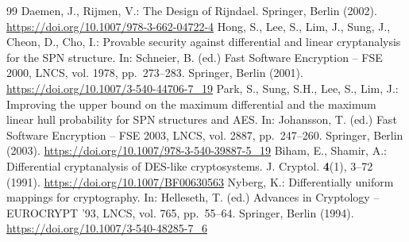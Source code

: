 \documentclass[11pt]{article}
\theoremstyle{definition}
\theoremstyle{remark}
\begin{document}
\begin{thebibliography}{99}
 Daemen, J., Rijmen, V.: The Design of Rijndael. Springer, Berlin (2002).
\url{https://doi.org/10.1007/978-3-662-04722-4}
 Hong, S., Lee, S., Lim, J., Sung, J., Cheon, D., Cho, I.: Provable security against differential and
linear cryptanalysis for the SPN structure. In: Schneier, B. (ed.) Fast Software Encryption -- FSE 2000, LNCS, vol.
1978, pp.~273--283. Springer, Berlin (2001). \url{https://doi.org/10.1007/3-540-44706-7_19}
 Park, S., Sung, S.H., Lee, S., Lim, J.: Improving the upper bound on the maximum differential and the
maximum linear hull probability for SPN structures and AES. In: Johansson, T. (ed.) Fast Software Encryption -- FSE
2003, LNCS, vol. 2887, pp.~247--260. Springer, Berlin (2003). \url{https://doi.org/10.1007/978-3-540-39887-5_19}
 Biham, E., Shamir, A.: Differential cryptanalysis of DES-like cryptosystems. J. Cryptol. \textbf{4}(1),
3--72 (1991). \url{https://doi.org/10.1007/BF00630563}
 Nyberg, K.: Differentially uniform mappings for cryptography. In: Helleseth, T. (ed.) Advances in
Cryptology -- EUROCRYPT '93, LNCS, vol. 765, pp.~55--64. Springer, Berlin (1994).
\url{https://doi.org/10.1007/3-540-48285-7_6}
\end{thebibliography}
\end{document}
